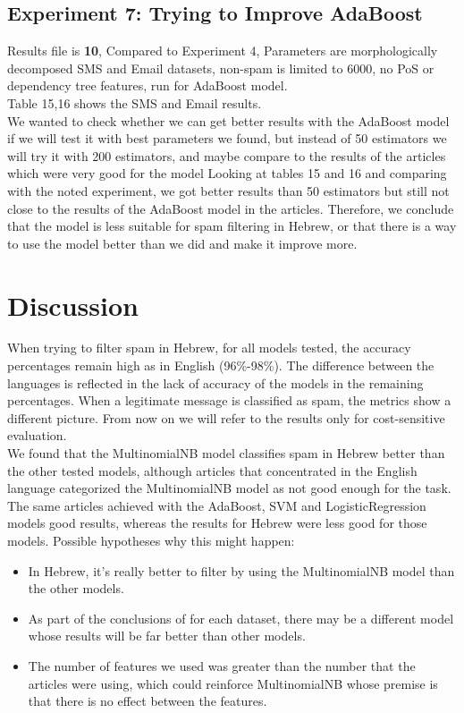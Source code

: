 \documentclass[11pt,a4paper]{article}
\begin{document}
\subsection{Experiment 7: Trying to Improve AdaBoost}
\label{ssec:Experiment 7}
Results file is \textbf{10}, Compared to Experiment 4, Parameters are morphologically decomposed SMS and Email datasets, non-spam is limited to 6000, no PoS or dependency tree features, run for AdaBoost model.\\
Table 15,16 shows the SMS and Email results.\\
We wanted to check whether we can get better results with the AdaBoost model if we will test it with best parameters we found, but instead of 50 estimators we will try it with 200 estimators, and maybe compare to the results of the articles which were very good for the model
Looking at tables 15 and 16 and comparing with the noted experiment, we got better results than 50 estimators but still not close to the results of the AdaBoost model in the articles. Therefore, we conclude that the model is less suitable for spam filtering in Hebrew, or that there is a way to use the model better than we did and make it improve more.

\section{Discussion}
When trying to filter spam in Hebrew, for all models tested, the accuracy percentages remain high as in English (96\%-98\%). The difference between the languages is reflected in the lack of accuracy of the models in the remaining percentages. When a legitimate message is classified as spam, the metrics show a different picture. From now on we will refer to the results only for cost-sensitive evaluation.\\
We found that the MultinomialNB model classifies spam in Hebrew better than the other tested models, although articles that concentrated in the English language categorized the MultinomialNB model as not good enough for the task. The same articles achieved with the AdaBoost, SVM and LogisticRegression models good results, whereas the results for Hebrew were less good for those models.
Possible hypotheses why this might happen:
\begin{itemize}
\item In Hebrew, it's really better to filter by using the MultinomialNB model than the other models.
\item As part of the conclusions of \citep{andrew2007scalable} for each dataset, there may be a different model whose results will be far better than other models.
\item The number of features we used was greater than the number that the articles were using, which could reinforce MultinomialNB whose premise is that there is no effect between the features.
\end{itemize}
\end{document}
